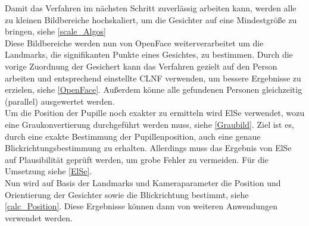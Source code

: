 Damit das Verfahren im nächsten Schritt zuverlässig arbeiten kann, werden alle zu kleinen Bildbereiche hochskaliert, um die Gesichter auf eine Mindestgröße zu bringen, siehe \autoref{scale_Algos}\\
Diese Bildbereiche werden nun von OpenFace weiterverarbeitet um die Landmarks, die signifikanten Punkte eines Gesichtes, zu bestimmen. Durch die vorige Zuordnung der Gesichert kann das Verfahren gezielt auf den Person arbeiten und entsprechend einstellte CLNF verwenden, um bessere Ergebnisse zu erzielen, siehe \autoref{OpenFace}. Außerdem könne alle gefundenen Personen gleichzeitig (parallel) ausgewertet werden.\\
Um die Position der Pupille noch exakter zu ermitteln wird ElSe verwendet, wozu eine Graukonvertierung durchgeführt werden muss, siehe \autoref{Graubild}. Ziel ist es, durch eine exakte Bestimmung der Pupillenposition, auch eine genaue Blickrichtungsbestimmung zu erhalten. Allerdings muss das Ergebnis von ElSe auf Plausibilität geprüft werden, um grobe Fehler zu vermeiden. Für die Umsetzung siehe \autoref{ElSe}.\\
Nun wird auf Basis der Landmarks und Kameraparameter die Position und Orientierung der Gesichter sowie die Blickrichtung bestimmt, siehe \autoref{calc_Position}. Diese Ergebnisse können dann von weiteren Anwendungen verwendet werden.